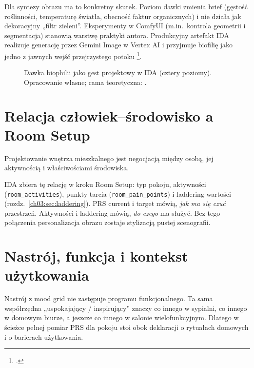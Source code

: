 Dla syntezy obrazu ma to konkretny skutek. Poziom dawki zmienia brief (gęstość roślinności, temperaturę światła, obecność faktur organicznych) i nie działa jak dekoracyjny „filtr zieleni”.
Eksperymenty w ComfyUI (m.in.\ kontrola geometrii i segmentacja) stanowią warstwę praktyki autora. Produkcyjny artefakt IDA realizuje generację przez Gemini Image w Vertex AI i przyjmuje biofilię jako jedno z jawnych wejść przejrzystego potoku \footcite{idaPlatform2026}.

\begin{figure}[htbp]
  \centering
  \caption{Dawka biophilii jako gest projektowy w IDA (cztery poziomy).
    Opracowanie własne; rama teoretyczna: \textcite{kellert2008biophilic}.}
  \label{fig:ch02:biophilia}
\end{figure}

\section{Relacja człowiek--środowisko a Room Setup}
\label{ch02:sec:peo}

Projektowanie wnętrza mieszkalnego jest negocjacją między osobą, jej aktywnością i właściwościami środowiska.

IDA zbiera tę relację w kroku Room Setup: typ pokoju, aktywności (\texttt{room\_activities}), punkty tarcia (\texttt{room\_pain\_points}) i laddering wartości (rozdz.~\ref{ch03:sec:laddering}).
PRS current i target mówią, \emph{jak ma się czuć} przestrzeń. Aktywności i laddering mówią, \emph{do czego} ma służyć.
Bez tego połączenia personalizacja obrazu zostaje stylizacją pustej scenografii.

\section{Nastrój, funkcja i kontekst użytkowania}
\label{ch02:sec:nastroj}

Nastrój z mood grid nie zastępuje programu funkcjonalnego.
Ta sama współrzędna „uspokajający / inspirujący” znaczy co innego w sypialni, co innego w domowym biurze, a jeszcze co innego w salonie wielofunkcyjnym.
Dlatego w ścieżce pełnej pomiar PRS dla pokoju stoi obok deklaracji o rytuałach domowych i o barierach użytkowania.

